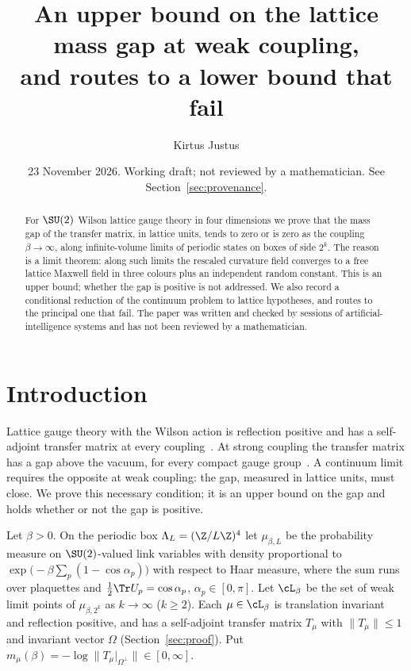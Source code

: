 
\title[An upper bound on the lattice mass gap at weak coupling]{An upper bound on the lattice mass gap at weak coupling,\\ and routes to a lower bound that fail}
\author{Kirtus Justus}
\address{Theoretical Physicist, Port Coquitlam, British Columbia, Canada}
\date{23 November 2026. Working draft; not reviewed by a mathematician. See Section~\ref{sec:provenance}.}

\begin{abstract}
For $\SU(2)$ Wilson lattice gauge theory in four dimensions we prove that the mass gap of the transfer matrix,
in lattice units, tends to zero or is zero as the coupling $\beta\to\infty$, along infinite-volume limits of
periodic states on boxes of side $2^k$. The reason is a limit theorem: along such limits the rescaled curvature
field converges to a free lattice Maxwell field in three colours plus an independent random constant. This is an
upper bound; whether the gap is positive is not addressed.
We also record a conditional reduction of the continuum problem to lattice hypotheses, and routes to the
principal one that fail. The paper was written and checked by sessions of artificial-intelligence systems and
has not been reviewed by a mathematician.
\end{abstract}
\maketitle
\tableofcontents

\section{Introduction}\label{sec:intro}

Lattice gauge theory with the Wilson action is reflection positive and has a self-adjoint transfer matrix at every coupling~\cite{OS78,Lu77}. At strong coupling the transfer matrix has a gap above the vacuum, for every compact gauge group~\cite{OS78}. A continuum limit requires the opposite at weak coupling: the gap, measured in lattice units, must close. We prove this necessary condition; it is an upper bound on the gap and holds whether or not the gap is positive.

Let $\beta>0$. On the periodic box $\Lambda_L=(\Z/L\Z)^4$ let $\mu_{\beta,L}$ be the probability measure on $\SU(2)$-valued link variables with density proportional to $\exp\bigl(-\beta\sum_p(1-\cos\alpha_p)\bigr)$ with respect to Haar measure, where the sum runs over plaquettes and $\tfrac12\Tr U_p=\cos\alpha_p$, $\alpha_p\in[0,\pi]$. Let $\cL_\beta$ be the set of weak limit points of $\mu_{\beta,2^k}$ as $k\to\infty$ ($k\ge2$). Each $\mu\in\cL_\beta$ is translation invariant and reflection positive, and has a self-adjoint transfer matrix $T_\mu$ with $\|T_\mu\|\le 1$ and invariant vector $\Omega$ (Section~\ref{sec:proof}). Put $m_\mu(\beta)=-\log\|T_\mu|_{\Omega^\perp}\|\in[0,\infty]$.


